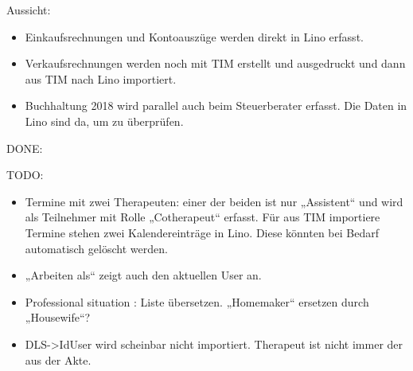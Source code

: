 \documentclass[letterpaper,10pt,ngerman]{sphinxmanual}
\begin{document}
Aussicht:
\begin{itemize}
\item {} 
Einkaufsrechnungen und Kontoauszüge werden direkt in Lino erfasst.

\item {} 
Verkaufsrechnungen werden noch mit TIM erstellt und ausgedruckt und
dann aus TIM nach Lino importiert.

\item {} 
Buchhaltung 2018 wird parallel auch beim Steuerberater erfasst. Die
Daten in Lino sind da, um zu überprüfen.

\end{itemize}

DONE:

TODO:
\begin{itemize}
\item {} 
Termine mit zwei Therapeuten: einer der beiden ist nur „Assistent“
und wird als Teilnehmer mit Rolle „Cotherapeut“ erfasst.  Für aus
TIM importiere Termine stehen zwei Kalendereinträge in Lino. Diese
könnten bei Bedarf automatisch gelöscht werden.

\item {} 
„Arbeiten als“  zeigt auch den aktuellen User an.

\item {} 
Professional situation : Liste übersetzen. „Homemaker“ ersetzen
durch „Housewife“?

\item {} 
DLS-\textgreater{}IdUser wird scheinbar nicht importiert. Therapeut ist nicht
immer der aus der Akte.

\end{itemize}
\end{document}
